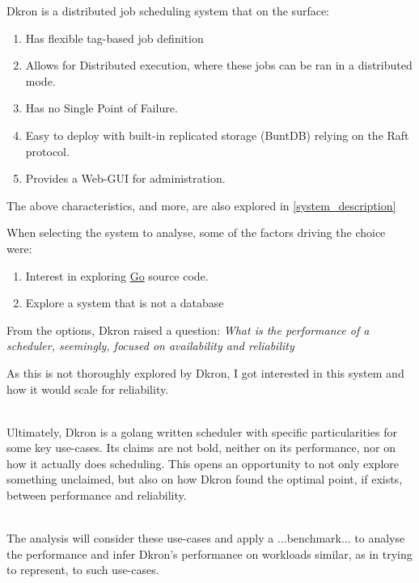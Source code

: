 \documentclass[runningheads]{llncs}
\begin{document}
Dkron is a distributed job scheduling system that on the surface:

\begin{enumerate}
    \item Has flexible tag-based job definition
    \item Allows for Distributed execution, where these jobs can be ran in a distributed mode. %
    \item Has no Single Point of Failure.
    \item Easy to deploy with built-in replicated storage (BuntDB) relying on the Raft protocol.
    \item Provides a Web-GUI for administration.
\end{enumerate}
The above characteristics, and more, are also explored in \ref{system_description}

\break
When selecting the system to analyse, some of the factors driving the choice were:
\begin{enumerate}
    \item Interest in exploring \href{https://go.dev/}{Go} source code.
    \item Explore a system that is not a database
\end{enumerate}
From the options, Dkron raised a question:
\textit{What is the performance of a scheduler, seemingly, focused on availability and reliability}

As this is not thoroughly explored by Dkron, I got interested in this system and how it would scale
for reliability.

~\\
Ultimately, Dkron is a golang written scheduler with specific particularities for some key use-cases.
Its claims are not bold, neither on its performance, nor on how it actually does scheduling. This opens an
opportunity to not only explore something unclaimed, but also on how Dkron found the
optimal point, if exists, between performance and reliability.

~\\ The analysis will consider these use-cases and apply a ...benchmark... to analyse the performance and infer Dkron's
performance on workloads similar, as in trying to represent, to such use-cases.

\begin{figure}[h]
\centering
\end{figure}
\end{document}
